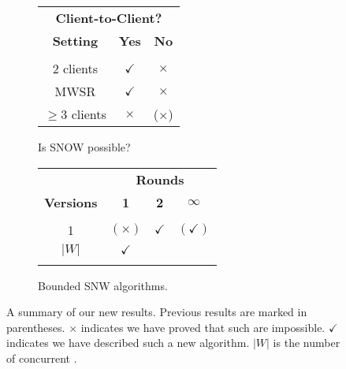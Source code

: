 \begin{figure}[t]
  \centering
  \begin{subfigure}[b]{0.49\columnwidth} {
      \begin{center}
\begin{tabular}{@{}c c c@{}}
  \midrule
                   \multicolumn{3}{c}{\phantom{ABCDef}\textbf{Client-to-Client?}}\\
  \textbf{Setting} & \textbf{Yes}        & \textbf{No}\\
  \hline\\[-1.8ex]
  2 clients        & $\checkmark$   & $\times$ \\
  MWSR             & $\checkmark$   & $\times$ \\
  $\ge 3$ clients  & $\times$       & ($\times$)\\
  \midrule
\end{tabular}
      \end{center}
    }
    \caption{Is SNOW possible?}
    \label{fig:contr_table_a}
  \end{subfigure}
  \hfill
  \begin{subfigure}[b]{0.49\columnwidth} {
      \begin{center}
\begin{tabular}{@{}c c c c@{}}
  \midrule          
  & \multicolumn{3}{c}{\phantom{a}\textbf{Rounds}}\\
  \textbf{Versions} & \textbf{1}    & \textbf{2}    & $\boldsymbol{\infty}$ \\
  \hline\\[-1.8ex]
                1   & $(\times)$    & $\checkmark$  & $(\checkmark)$ \\
              $|W|$ & $\checkmark$  &  & \\
  \midrule\\
\end{tabular}
      \end{center}
    }
    \caption{Bounded SNW algorithms.}
    \label{fig:contr_table_b}
  \end{subfigure} 
  \caption{A summary of our new results.  Previous results are marked in parentheses.
    $\times$ indicates we have proved that such \rots{} are impossible.
    $\checkmark$ indicates we have described such a new \rot{} algorithm. %
    $|W|$ is the number of concurrent \wots{}.}
  \label{tbl:result_map}
  \vspace{-1.5em}
\end{figure}
